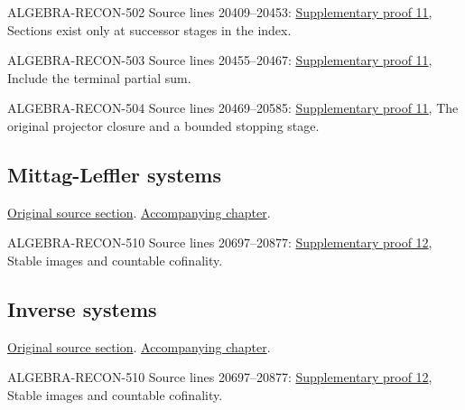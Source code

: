 \begin{AlgebraSourceRoutes}
\item[ALGEBRA-RECON-502] Source lines 20409--20453: \hyperlink{algebra_transfinite_devissage_notes_20260927}{Supplementary proof 11}, Sections exist only at successor stages in the index.
\item[ALGEBRA-RECON-503] Source lines 20455--20467: \hyperlink{algebra_transfinite_devissage_notes_20260927}{Supplementary proof 11}, Include the terminal partial sum.
\item[ALGEBRA-RECON-504] Source lines 20469--20585: \hyperlink{algebra_transfinite_devissage_notes_20260927}{Supplementary proof 11}, The original projector closure and a bounded stopping stage.
\end{AlgebraSourceRoutes}

\subsection{Mittag-Leffler systems}
\hypertarget{algebra-source-section-mittag-leffler}{}
\noindent\href{https://github.com/stacks/stacks-project/blob/a04446e57ec1fbc252a871afcec7752fb2807b14/algebra.tex\#L20697}{Original source section}. \href{algebra.pdf\#nameddest=section-mittag-leffler}{Accompanying chapter}.

\begin{AlgebraSourceRoutes}
\item[ALGEBRA-RECON-510] Source lines 20697--20877: \hyperlink{algebra_ml_review_notes_20260927}{Supplementary proof 12}, Stable images and countable cofinality.
\end{AlgebraSourceRoutes}

\subsection{Inverse systems}
\hypertarget{algebra-source-section-inverse-systems}{}
\noindent\href{https://github.com/stacks/stacks-project/blob/a04446e57ec1fbc252a871afcec7752fb2807b14/algebra.tex\#L20816}{Original source section}. \href{algebra.pdf\#nameddest=section-inverse-systems}{Accompanying chapter}.

\begin{AlgebraSourceRoutes}
\item[ALGEBRA-RECON-510] Source lines 20697--20877: \hyperlink{algebra_ml_review_notes_20260927}{Supplementary proof 12}, Stable images and countable cofinality.
\end{AlgebraSourceRoutes}

